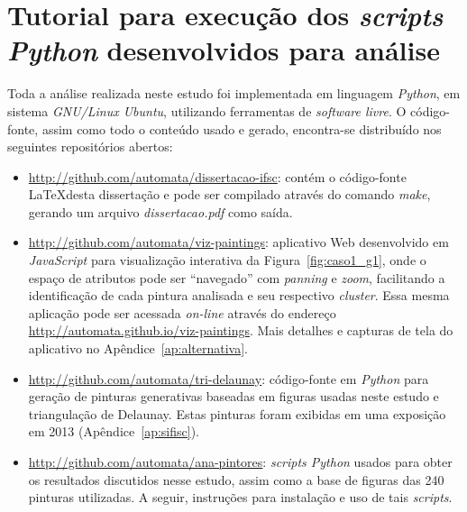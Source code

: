 \chapter{Tutorial para execução dos \textit{scripts Python} desenvolvidos para análise}
\label{cap:ap-tutorial}

Toda a análise realizada neste estudo foi implementada em linguagem
\textit{Python}, em sistema \textit{GNU/Linux Ubuntu}, utilizando
ferramentas de \textit{software livre}. O código-fonte, assim como
todo o conteúdo usado e gerado, encontra-se distribuído nos seguintes
repositórios abertos:

\begin{itemize}
  \item{\url{http://github.com/automata/dissertacao-ifsc}: contém o
    código-fonte \LaTeX  desta dissertação e pode ser compilado através
    do comando \textit{make}, gerando um arquivo
    \textit{dissertacao.pdf} como saída.}
  \item{\url{http://github.com/automata/viz-paintings}: aplicativo Web
    desenvolvido em \textit{JavaScript} para visualização interativa
    da Figura~\ref{fig:caso1_g1}, onde o espaço de atributos pode ser
    ``navegado'' com \textit{panning} e \textit{zoom}, facilitando a
    identificação de cada pintura analisada e seu respectivo
    \textit{cluster}. Essa mesma aplicação pode ser acessada
    \textit{on-line} através do endereço
    \url{http://automata.github.io/viz-paintings}. Mais detalhes e
    capturas de tela do aplicativo no Apêndice~\ref{ap:alternativa}.}
  \item{\url{http://github.com/automata/tri-delaunay}: código-fonte em
    \textit{Python} para geração de pinturas generativas baseadas em
    figuras usadas neste estudo e triangulação de Delaunay. Estas
    pinturas foram exibidas em uma exposição em 2013
    (Apêndice~\ref{ap:sifisc}).}
  \item{\url{http://github.com/automata/ana-pintores}: \textit{scripts
      Python} usados para obter os resultados discutidos nesse estudo,
    assim como a base de figuras das 240 pinturas utilizadas. A
    seguir, instruções para instalação e uso de tais
    \textit{scripts}.}
\end{itemize}

